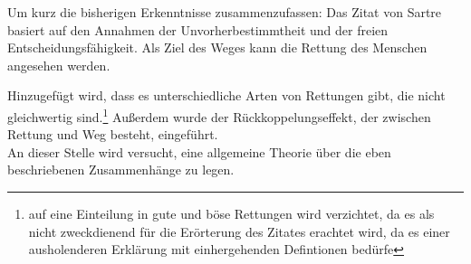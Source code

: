 \documentclass[12pt,a4paper,twoside]{article}
\begin{document}
  Um kurz die bisherigen Erkenntnisse zusammenzufassen: Das Zitat von Sartre basiert auf den Annahmen der Unvorherbestimmtheit und der freien Entscheidungsfähigkeit. Als Ziel des Weges kann die Rettung des Menschen angesehen werden. 
  
  Hinzugefügt wird, dass es unterschiedliche Arten von Rettungen gibt, die nicht gleichwertig sind.\footnote{auf eine Einteilung in gute und böse Rettungen wird verzichtet, da es als nicht zweckdienend für die Erörterung des Zitates erachtet wird, da es einer ausholenderen Erklärung mit einhergehenden Defintionen bedürfe} Außerdem wurde der Rückkoppelungseffekt, der zwischen Rettung und Weg besteht, eingeführt. \\
  
  An dieser Stelle wird versucht, eine allgemeine Theorie über die eben beschriebenen Zusammenhänge zu legen. 
  
  
\end{document}
